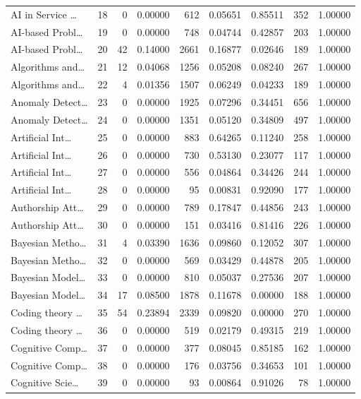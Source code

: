\begin{table}
\begin{tabular}{lrrrrrrrr}
AI in Service … & 18 & 0 & 0.00000 & 612 & 0.05651 & 0.85511 & 352 & 1.00000 \\
AI-based Probl… & 19 & 0 & 0.00000 & 748 & 0.04744 & 0.42857 & 203 & 1.00000 \\
AI-based Probl… & 20 & 42 & 0.14000 & 2661 & 0.16877 & 0.02646 & 189 & 1.00000 \\
Algorithms and… & 21 & 12 & 0.04068 & 1256 & 0.05208 & 0.08240 & 267 & 1.00000 \\
Algorithms and… & 22 & 4 & 0.01356 & 1507 & 0.06249 & 0.04233 & 189 & 1.00000 \\
Anomaly Detect… & 23 & 0 & 0.00000 & 1925 & 0.07296 & 0.34451 & 656 & 1.00000 \\
Anomaly Detect… & 24 & 0 & 0.00000 & 1351 & 0.05120 & 0.34809 & 497 & 1.00000 \\
Artificial Int… & 25 & 0 & 0.00000 & 883 & 0.64265 & 0.11240 & 258 & 1.00000 \\
Artificial Int… & 26 & 0 & 0.00000 & 730 & 0.53130 & 0.23077 & 117 & 1.00000 \\
Artificial Int… & 27 & 0 & 0.00000 & 556 & 0.04864 & 0.34426 & 244 & 1.00000 \\
Artificial Int… & 28 & 0 & 0.00000 & 95 & 0.00831 & 0.92090 & 177 & 1.00000 \\
Authorship Att… & 29 & 0 & 0.00000 & 789 & 0.17847 & 0.44856 & 243 & 1.00000 \\
Authorship Att… & 30 & 0 & 0.00000 & 151 & 0.03416 & 0.81416 & 226 & 1.00000 \\
Bayesian Metho… & 31 & 4 & 0.03390 & 1636 & 0.09860 & 0.12052 & 307 & 1.00000 \\
Bayesian Metho… & 32 & 0 & 0.00000 & 569 & 0.03429 & 0.44878 & 205 & 1.00000 \\
Bayesian Model… & 33 & 0 & 0.00000 & 810 & 0.05037 & 0.27536 & 207 & 1.00000 \\
Bayesian Model… & 34 & 17 & 0.08500 & 1878 & 0.11678 & 0.00000 & 188 & 1.00000 \\
Coding theory … & 35 & 54 & 0.23894 & 2339 & 0.09820 & 0.00000 & 270 & 1.00000 \\
Coding theory … & 36 & 0 & 0.00000 & 519 & 0.02179 & 0.49315 & 219 & 1.00000 \\
Cognitive Comp… & 37 & 0 & 0.00000 & 377 & 0.08045 & 0.85185 & 162 & 1.00000 \\
Cognitive Comp… & 38 & 0 & 0.00000 & 176 & 0.03756 & 0.34653 & 101 & 1.00000 \\
Cognitive Scie… & 39 & 0 & 0.00000 & 93 & 0.00864 & 0.91026 & 78 & 1.00000 \\

\end{tabular}
\end{table}
